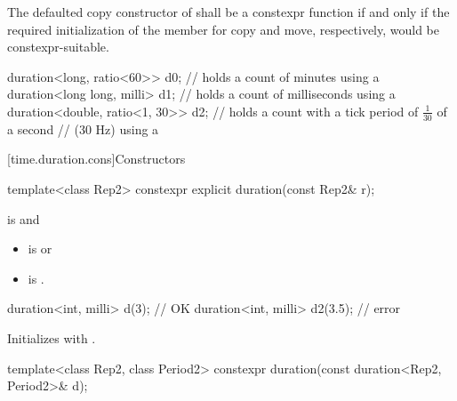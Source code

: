 \pnum
The defaulted copy constructor of  shall be a
constexpr function if and only if the required initialization
of the member  for copy and move, respectively, would
be constexpr-suitable.

\pnum
\begin{example}
\begin{codeblock}
duration<long, ratio<60>> d0;       // holds a count of minutes using a 
duration<long long, milli> d1;      // holds a count of milliseconds using a 
duration<double, ratio<1, 30>>  d2; // holds a count with a tick period of $\frac{1}{30}$ of a second
                                    // (30 Hz) using a 
\end{codeblock}
\end{example}

[time.duration.cons]{Constructors}

%
\begin{itemdecl}
template<class Rep2>
  constexpr explicit duration(const Rep2& r);
\end{itemdecl}

\begin{itemdescr}
\pnum
\constraints
{} is  and
\begin{itemize}
\item {} is  or
\item {} is .
\end{itemize}
\begin{example}
\begin{codeblock}
duration<int, milli> d(3);          // OK
duration<int, milli> d2(3.5);       // error
\end{codeblock}
\end{example}

\pnum
\effects
Initializes  with .
\end{itemdescr}

%
\begin{itemdecl}
template<class Rep2, class Period2>
  constexpr duration(const duration<Rep2, Period2>& d);
\end{itemdecl}

